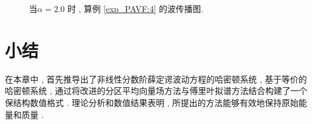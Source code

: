 \begin{figure}[H]
\begin{center}
{			} 
			\caption{当$\alpha=2.0$ 时 , 算例 \ref{exp_PAVF:4} 的波传播图.}
			\label{fig_PAVF:16}
			\end{center}
			\end{figure}

\section{小结}\label{Section_PAVF: 5}

在本章中 , 首先推导出了非线性分数阶薛定谔波动方程的哈密顿系统 , 基于等价的哈密顿系统 , 
通过将改进的分区平均向量场方法与傅里叶拟谱方法结合构建了一个保结构数值格式 . 
理论分析和数值结果表明 , 所提出的方法能够有效地保持原始能量和质量 . 
